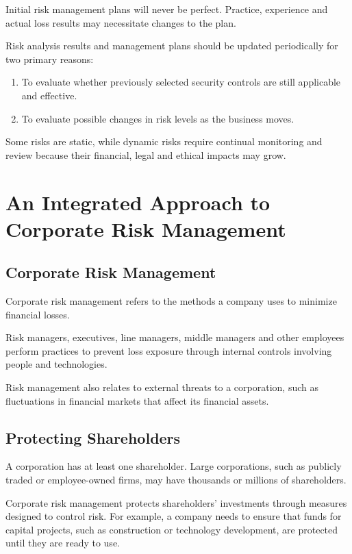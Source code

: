 \documentclass[
]{book}
\providecommand{\tightlist}{%
  \setlength{\itemsep}{0pt}\setlength{\parskip}{0pt}}
\begin{document}
Initial risk management plans will never be perfect. Practice, experience and actual loss results may necessitate changes to the plan.

Risk analysis results and management plans should be updated periodically for two primary reasons:

\begin{enumerate}
\def\labelenumi{\arabic{enumi}.}
\tightlist
\item
  To evaluate whether previously selected security controls are still applicable and effective.
\item
  To evaluate possible changes in risk levels as the business moves.
\end{enumerate}

Some risks are static, while dynamic risks require continual monitoring and review because their financial, legal and ethical impacts may grow.

\chapter{An Integrated Approach to Corporate Risk Management}\label{an-integrated-approach-to-corporate-risk-management}

\section{Corporate Risk Management}\label{corporate-risk-management}

Corporate risk management refers to the methods a company uses to minimize financial losses.

Risk managers, executives, line managers, middle managers and other employees perform practices to prevent loss exposure through internal controls involving people and technologies.

Risk management also relates to external threats to a corporation, such as fluctuations in financial markets that affect its financial assets.

\section{Protecting Shareholders}\label{protecting-shareholders}

A corporation has at least one shareholder. Large corporations, such as publicly traded or employee-owned firms, may have thousands or millions of shareholders.

Corporate risk management protects shareholders' investments through measures designed to control risk. For example, a company needs to ensure that funds for capital projects, such as construction or technology development, are protected until they are ready to use.
\end{document}
